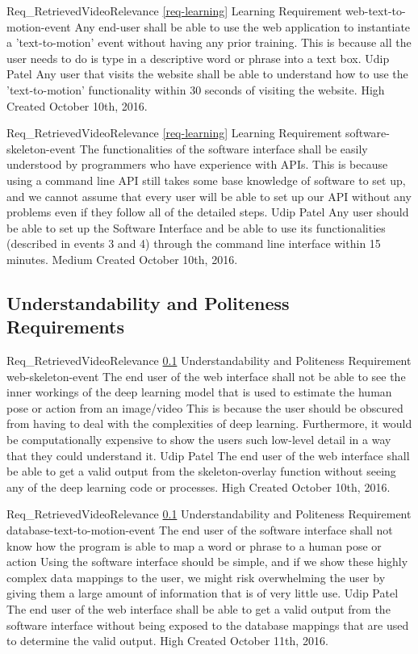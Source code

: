 \documentclass{scrreprt}
\begin{document}
\requirement
{Req_RetrievedVideoRelevance}
{\ref{req-learning} Learning Requirement}
{web-text-to-motion-event}
{Any end-user shall be able to use the web application to instantiate a 'text-to-motion' event without having any prior training.}
{This is because all the user needs to do is type in a descriptive word or phrase into a text box.}
{Udip Patel}
{Any user that visits the website shall be able to understand how to use the 'text-to-motion' functionality within 30 seconds of visiting the website.}
{High}
{Created October 10th, 2016.}

\requirement
{Req_RetrievedVideoRelevance}
{\ref{req-learning} Learning Requirement}
{software-skeleton-event} %
{The functionalities of the software interface shall be easily understood by programmers who have experience with APIs.}
{This is because using a command line API still takes some base knowledge of software to set up, and we cannot assume that every user will be able to set up our API without any problems even if they follow all of the detailed steps.}
{Udip Patel}
{Any user should be able to set up the Software Interface and be able to use its functionalities (described in events 3 and 4) through the command line interface within 15 minutes.}
{Medium}
{Created October 10th, 2016.}

\subsection{Understandability and Politeness Requirements}
\label{req-understandability-politeness}

\requirement
{Req_RetrievedVideoRelevance}
{\ref{req-understandability-politeness} Understandability and Politeness Requirement}
{web-skeleton-event}
{The end user of the web interface shall not be able to see the inner workings
of the deep learning model that is used to estimate the human pose or action
from an image/video}
{This is because the user should be obscured from having to deal with the
complexities of deep learning. Furthermore, it would be computationally
expensive to show the users such low-level detail in a way that they could
understand it.}
{Udip Patel}
{The end user of the web interface shall be able to get a valid output from the
skeleton-overlay function without seeing any of the deep learning code or
processes.}
{High}
{Created October 10th, 2016.}

\requirement
{Req_RetrievedVideoRelevance}
{\ref{req-understandability-politeness} Understandability and Politeness Requirement}
{database-text-to-motion-event}
{The end user of the software interface shall not know how the program is able
to map a word or phrase to a human pose or action}
{Using the software interface should be simple, and if we show these highly
complex data mappings to the user, we might risk overwhelming the user by
giving them a large amount of information that is of very little use.}
{Udip Patel}
{The end user of the web interface shall be able to get a valid output from the
software interface without being exposed to the database mappings that are used
to determine the valid output.}
{High}
{Created October 11th, 2016.}
\end{document}
